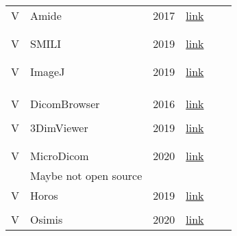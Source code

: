 \documentclass{article}
\begin{document}
\begin{longtable}{|l|l|l|l|l|l|}
V & Amide & 2017 & \href{http://amide.sourceforge.net/}{link} & \begin{tabular}[c]{@{}l@{}}\citep{Emms2019}\\ \citep{Hasan2020}\\ \citep{Mu2019}\end{tabular} &  \\ \hline
V & SMILI & 2019 & \href{https://smili-project.sourceforge.io/}{link} & \begin{tabular}[c]{@{}l@{}}\citep{Emms2019}\\ \citep{Hasan2020}\\ \citep{Mu2019}\end{tabular} &  \\ \hline
V & ImageJ & 2019 & \href{https://imagej.nih.gov/ij/index.html}{link} & \begin{tabular}[c]{@{}l@{}}\citep{Emms2019}\\ \citep{Hasan2020}\\ \citep{Samala2014}\\ \citep{Haak2015}\end{tabular} &  \\ \hline
V & DicomBrowser & 2016 & \href{https://wiki.xnat.org/xnat-tools/dicombrowser}{link} & \begin{tabular}[c]{@{}l@{}}\citep{Emms2019}\\ \citep{Hasan2020}\end{tabular} &  \\ \hline
V & 3DimViewer & 2019 & \href{https://bitbucket.org/3dimlab/3dimviewer/src/master/}{link} & \begin{tabular}[c]{@{}l@{}}\citep{Bjorn2017}\\ \citep{Hasan2020}\\ \citep{Mu2019}\end{tabular} &  \\ \hline
V & MicroDicom & 2020 & \href{http://www.microdicom.com/}{link} & \begin{tabular}[c]{@{}l@{}}\citep{Mu2019}\\ \citep{Bjorn2017}\end{tabular} & Maybe not open source \\ \hline
V & Horos & 2019 & \href{https://github.com/horosproject/horos}{link} & \begin{tabular}[c]{@{}l@{}}\citep{Bjorn2017}\\ \citep{Bruhschwein2019}\end{tabular} &  \\ \hline
V & Osimis & 2020 & \href{https://bitbucket.org/osimis/osimis-webviewer-plugin/src/master/}{link} & \citep{Bjorn2017} &  \\ \hline

\end{longtable}
\end{document}
